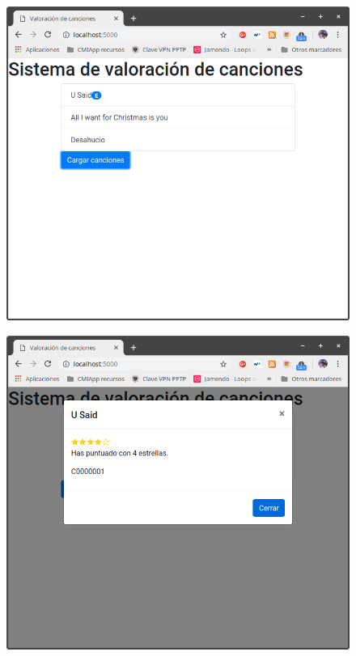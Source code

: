 \documentclass[12pt,a4paper]{article}
\begin{document}
\begin{figure}[H]
\centering
\includegraphics[scale=0.40]{implementaciones/implementacion_javier/imagenes/lista_canciones.png}
\end{figure}

\begin{figure}[H]
\centering
\includegraphics[scale=0.40]{implementaciones/implementacion_javier/imagenes/valoracion.png}
\end{figure}
\end{document}
